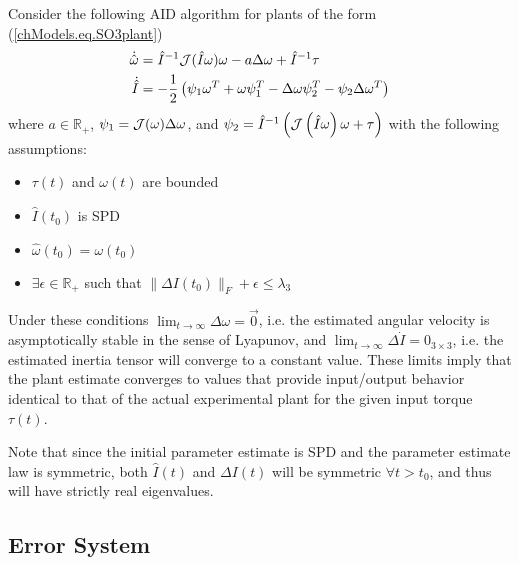 \begin{SO3_AID}
\label{chSMS_ID.theo.SO3_AID}
Consider the following \ac{AID} algorithm for plants of the form
(\ref{chModels.eq.SO3plant})
%
\begin{align}
  \dot{\hat{\omega}}&=\hat{I}^{-1} \mathcal{J}(\hat{I}\omega)\omega
  - a \Delta \omega + \hat{I}^{-1} \tau   \label{chSMS_ID.eq.SO3_AID_estimator}\\
  \dot{\hat{I}}&=-\frac{1}{2}\left(\psi_1 \omega^T +\omega \psi_1^T
    -\Delta\omega \psi_2^T-\psi_2 \Delta\omega^T\right)
  \label{chSMS_ID.eq.SO3_AID_identifier}
\end{align}
%
where $a\in\mathbb{R}_+$,  $\psi_1=\mathcal{J}(\omega)\Delta \omega$, and 
  $\psi_2=\hat{I}^{-1}\left(\mathcal{J}\left(\hat{I}\omega\right)
    \omega +\tau\right)$
with the following assumptions:
%
\begin{itemize}
\item $\tau(t)$ and $\omega(t)$ are bounded
\item $\hat{I}(t_0)$ is \ac{SPD}
\item $\hat{\omega}(t_0)=\omega(t_0)$
\item $\exists \epsilon \in \mathbb{R}_+$ such that $\|\Delta
  I(t_0)\|_F+\epsilon \leq \lambda_3$
\end{itemize}
%
Under these conditions $\lim_{t\to \infty}\Delta \omega=\vec{0}$,
i.e. the estimated angular velocity is asymptotically stable in the
sense of Lyapunov, and $\lim_{t\to \infty}\Delta
\dot{I}=0_{3\times3}$, i.e. the estimated inertia tensor will converge
to a constant value. These limits imply that the plant estimate
converges to values that provide input/output behavior identical to
that of the actual experimental plant for the given input torque
$\tau(t)$.
\end{SO3_AID}

Note that since the initial parameter estimate is \ac{SPD} and the
parameter estimate law is symmetric, both $\hat{I}(t)$ and $\Delta
I(t)$ will be symmetric $\forall t>t_0$, and thus will have strictly
real eigenvalues.


\subsection{Error System}\label{chSMS_ID.sec.SO3_AID_error}

